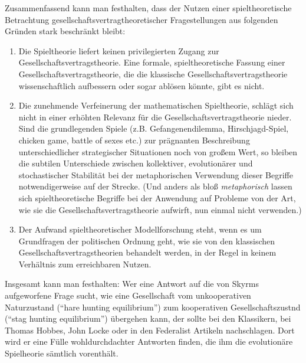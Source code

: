 \documentclass[12pt,a4paper,ngerman]{article}
\begin{document}
Zusammenfassend kann man festhalten, dass der Nutzen einer spieltheoretische
Betrachtung gesellschaftsvertragtheoretischer Fragestellungen aus folgenden
Gründen stark beschränkt bleibt:

\begin{enumerate}

\item Die Spieltheorie liefert keinen privilegierten Zugang zur
Gesellschaftsvertragstheorie. Eine formale, spieltheoretische Fassung einer
Gesellschaftsvertragstheorie, die die klassische Gesellschaftsvertragstheorie
wissenschaftlich aufbessern oder sogar ablösen könnte, gibt es nicht. 

\item Die zunehmende Verfeinerung der mathematischen Spieltheorie, schlägt sich
nicht in einer erhöhten Relevanz für die Gesellschaftsvertragstheorie 
nieder. Sind die grundlegenden Spiele (z.B. Gefangenendilemma,
Hirschjagd-Spiel, chicken game, battle of sexes etc.) zur prägnanten
Beschreibung unterschiedlicher strategischer Situationen noch von großem Wert,
so bleiben die subtilen Unterschiede zwischen kollektiver, evolutionärer und
stochastischer Stabilität bei der metaphorischen Verwendung dieser Begriffe
notwendigerweise auf der Strecke. (Und anders
als bloß {\em metaphorisch} lassen sich spieltheoretische
Begriffe bei der Anwendung auf Probleme von der Art, wie sie
die Gesellschaftsvertragstheorie aufwirft, nun einmal nicht verwenden.)

\item Der Aufwand spieltheoretischer Modellforschung steht, wenn es um
Grundfragen der politischen Ordnung geht, wie sie von den klassischen
Gesellschaftsvertragstheorien behandelt werden, in der Regel in keinem
Verhältnis zum erreichbaren Nutzen.

\end{enumerate}

Insgesamt kann man festhalten: Wer eine Antwort auf die von Skyrms aufgeworfene
Frage sucht, wie eine Gesellschaft vom unkooperativen Naturzustand ("`hare
hunting equilibrium"') zum kooperativen Gesellschaftszustnd ("`stag hunting
equilibrium"') übergehen kann, der sollte bei den Klassikern, bei Thomas
Hobbes, John Locke oder in den Federalist Artikeln nachschlagen. Dort wird er
eine Fülle wohldurchdachter Antworten finden, die ihm die evolutionäre
Spielheorie sämtlich vorenthält.

\end{document}
